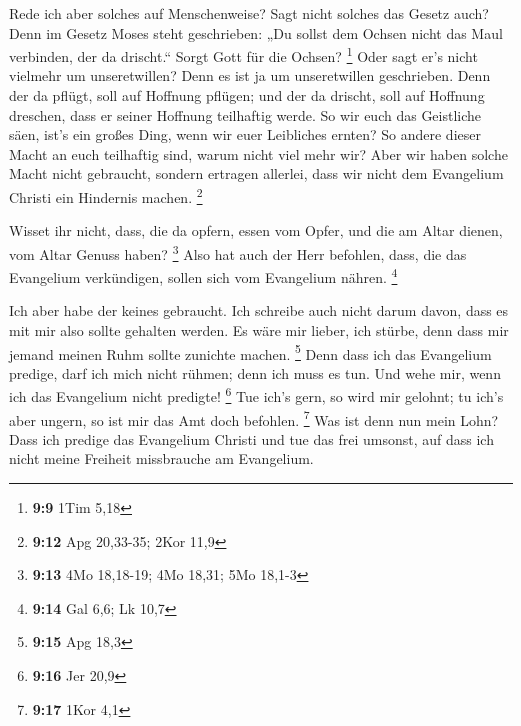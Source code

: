  Rede ich aber solches auf Menschenweise? Sagt nicht
solches das Gesetz auch?  Denn im Gesetz Moses steht
geschrieben: „Du sollst dem Ochsen nicht das Maul verbinden, der da
drischt.`` Sorgt Gott für die Ochsen? \footnote{\textbf{9:9} 1Tim 5,18}
 Oder sagt er's nicht vielmehr um unseretwillen? Denn es
ist ja um unseretwillen geschrieben. Denn der da pflügt, soll auf
Hoffnung pflügen; und der da drischt, soll auf Hoffnung dreschen, dass
er seiner Hoffnung teilhaftig werde.  So wir euch das
Geistliche säen, ist's ein großes Ding, wenn wir euer Leibliches ernten?
 So andere dieser Macht an euch teilhaftig sind, warum
nicht viel mehr wir? Aber wir haben solche Macht nicht gebraucht,
sondern ertragen allerlei, dass wir nicht dem Evangelium Christi ein
Hindernis machen. \footnote{\textbf{9:12} Apg 20,33-35; 2Kor 11,9}

 Wisset ihr nicht, dass, die da opfern, essen vom Opfer,
und die am Altar dienen, vom Altar Genuss haben? \footnote{\textbf{9:13}
  4Mo 18,18-19; 4Mo 18,31; 5Mo 18,1-3}  Also hat auch der
Herr befohlen, dass, die das Evangelium verkündigen, sollen sich vom
Evangelium nähren. \footnote{\textbf{9:14} Gal 6,6; Lk 10,7}

 Ich aber habe der keines gebraucht. Ich schreibe auch
nicht darum davon, dass es mit mir also sollte gehalten werden. Es wäre
mir lieber, ich stürbe, denn dass mir jemand meinen Ruhm sollte zunichte
machen. \footnote{\textbf{9:15} Apg 18,3}  Denn dass ich
das Evangelium predige, darf ich mich nicht rühmen; denn ich muss es
tun. Und wehe mir, wenn ich das Evangelium nicht predigte! \footnote{\textbf{9:16}
  Jer 20,9}  Tue ich's gern, so wird mir gelohnt; tu
ich's aber ungern, so ist mir das Amt doch befohlen. \footnote{\textbf{9:17}
  1Kor 4,1}  Was ist denn nun mein Lohn? Dass ich predige
das Evangelium Christi und tue das frei umsonst, auf dass ich nicht
meine Freiheit missbrauche am Evangelium.


